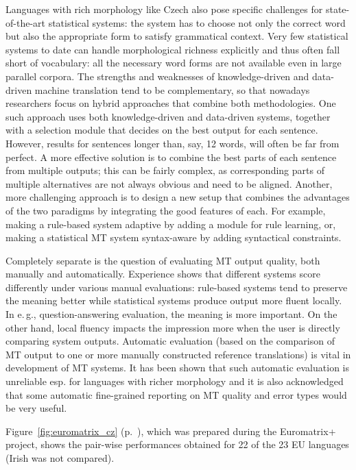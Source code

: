 \begin{multicols}{2}
Languages with rich morphology like Czech also pose specific challenges for state-of-the-art statistical systems: the system has to choose not only the correct word but also the appropriate form to satisfy grammatical context. Very few statistical systems to date can handle morphological richness explicitly and thus often fall short of vocabulary: all the necessary word forms are not available even in large parallel corpora.
The strengths and weaknesses of knowledge-driven and data-driven machine translation tend to be complementary, so that nowadays researchers focus on hybrid approaches that combine both methodologies. One such approach uses both knowledge-driven and data-driven systems, together with a selection module that decides on the best output for each sentence. However, results for sentences longer than, say, 12 words, will often be far from perfect. A more effective solution is to combine the best parts of each sentence from multiple outputs; this can be fairly complex, as corresponding parts of multiple alternatives are not always obvious and need to be aligned. Another, more challenging approach is to design a new setup that combines the advantages of the two paradigms by integrating the good features of each. For example, making a rule-based system adaptive by adding a module for rule learning, or, making a statistical MT system syntax-aware by adding syntactical constraints.

Completely separate is the question of evaluating MT output quality, both manually and automatically. Experience shows that different systems score differently under various manual evaluations: rule-based systems tend to preserve the meaning better while statistical systems produce output more fluent locally. In e.\,g., question-answering evaluation, the meaning is more important. On the other hand, local fluency impacts the impression more when the user is directly comparing system outputs. Automatic evaluation (based on the comparison of MT output to one or more manually constructed reference translations) is vital in development of MT systems. It has been shown that such automatic evaluation is unreliable esp. for languages with richer morphology and it is also acknowledged that some automatic fine-grained reporting on MT quality and error types would be very useful.

Figure~\ref{fig:euromatrix_cz} (p.~\pageref{fig:euromatrix_cz}), which was prepared during the Euromatrix+ project, shows the pair-wise performances obtained for 22 of the 23 EU languages (Irish was not compared). %


\end{multicols}

